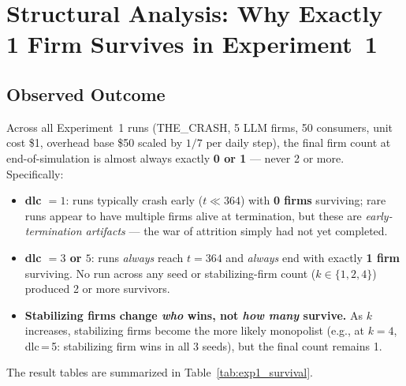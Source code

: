 \documentclass{article}
\begin{document}
\section{Structural Analysis: Why Exactly 1 Firm Survives in Experiment~1}

\subsection{Observed Outcome}

Across all Experiment~1 runs (THE\_CRASH, 5 LLM firms, 50 consumers, unit cost \$1, overhead base \$50 scaled by \(1/7\) per daily step), the final firm count at end-of-simulation is almost always exactly \textbf{0 or 1} --- never 2 or more. Specifically:

\begin{itemize}
  \item \textbf{dlc $= 1$}: runs typically crash early (\(t \ll 364\)) with \textbf{0 firms} surviving; rare runs appear to have multiple firms alive at termination, but these are \emph{early-termination artifacts} --- the war of attrition simply had not yet completed.
  \item \textbf{dlc $= 3$ or $5$}: runs \emph{always} reach \(t = 364\) and \emph{always} end with exactly \textbf{1 firm} surviving. No run across any seed or stabilizing-firm count (\(k \in \{1,2,4\}\)) produced 2 or more survivors.
  \item \textbf{Stabilizing firms change \emph{who} wins, not \emph{how many} survive.} As \(k\) increases, stabilizing firms become the more likely monopolist (e.g., at \(k=4\), dlc\,=\,5: stabilizing firm wins in all 3 seeds), but the final count remains 1.
\end{itemize}

\noindent The result tables are summarized in Table~\ref{tab:exp1_survival}.
\end{document}
